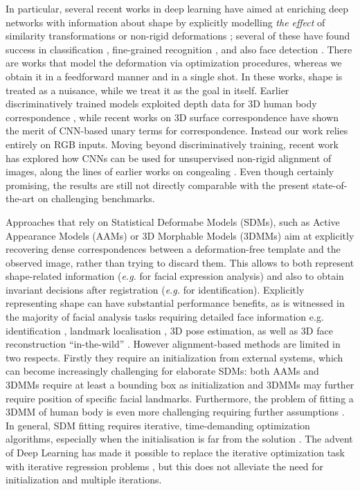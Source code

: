In particular, several recent works in deep learning have aimed at enriching deep networks with information about shape by explicitly modelling {\em the effect} of  similarity transformations \citep{PapandreouKS15}
or non-rigid deformations \citep{JaderbergSZK15,HandaBPSMD16,ChenHW016}; several of these have found success in classification \citep{PapandreouKS15}, fine-grained recognition  \citep{JaderbergSZK15}, and also face detection \citep{ChenHW016}. There are works \citep{lades1993distortion,pedersoli2015elastic} that model the deformation via optimization procedures, whereas we obtain it in a feedforward manner and in a single shot. In these works, shape is treated as a nuisance, while we treat it as the goal in itself. 
Earlier discriminatively trained models exploited depth data for 3D human body correspondence \citep{TaylorSSF12,WeiHCVL15}, while recent works on 3D surface correspondence \citep{Br1,Br2} have shown the merit of CNN-based unary terms for correspondence. Instead our work relies entirely on RGB inputs.
Moving beyond discriminatively training, recent work \citep{ThewlisBV17a}  has explored how CNNs can be used for unsupervised non-rigid alignment of images, along the lines of earlier works on congealing \citep{Learned-Miller06,KokkinosY07}. Even though certainly promising, the results are still not directly comparable with the present state-of-the-art on challenging benchmarks.

Approaches that rely on  Statistical Deformabe Models (SDMs), such as Active Appearance Models (AAMs) or 3D Morphable Models (3DMMs) aim at explicitly recovering  dense correspondences between a deformation-free template and the observed image, rather than trying to discard them. 
This allows to both represent shape-related information (\textit{e.g.} for facial expression analysis) and also to obtain invariant decisions after registration (\textit{e.g.} for identification). 
Explicitly representing shape  can have substantial performance benefits, as is witnessed in the majority of facial analysis tasks requiring detailed face information e.g. identification \citep{TaigmanYRW14}, landmark localisation \citep{sagonas2016300}, 3D pose estimation, as well as 3D face reconstruction ``in-the-wild'' \citep{jourabloo2016large}. 
However alignment-based methods are limited in two respects. Firstly they require an initialization from external systems, which can become increasingly challenging for elaborate SDMs: both AAMs and 3DMMs require at least a bounding box as initialization and 3DMMs may further require position of specific facial landmarks. Furthermore, the problem of fitting a 3DMM of human body is even more challenging requiring further assumptions \citep{lassner2017unite}. In general, SDM fitting  requires iterative, time-demanding optimization algorithms, especially when the initialisation is far from the solution \citep{booth20173d}. The advent of Deep Learning has made it possible to replace the iterative optimization task with iterative regression problems \citep{trigeorgis2016mnemonic}, but this does not alleviate the need for initialization and multiple iterations. 

